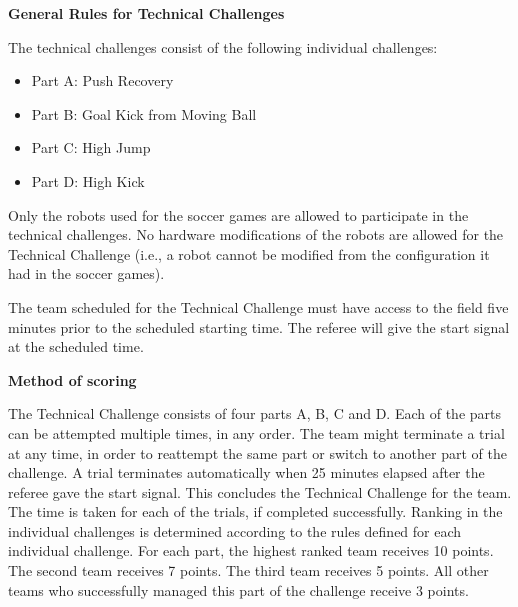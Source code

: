 \clearpage
\sffamily
{\bfseries\color[rgb]{0.4,0.4,0.4}
General Rules for Technical Challenges}
{}

\bigskip

The technical challenges consist of the following individual challenges:

\begin{itemize}
\item Part A: Push Recovery
\item Part B: Goal Kick from Moving Ball
\item Part C: High Jump 
\item Part D: High Kick
\end{itemize}

\bigskip

Only the robots used for the soccer games are allowed to participate in the technical challenges.  No hardware modifications of the robots are allowed for the Technical Challenge (i.e., a robot cannot be modified from the configuration it had in the soccer games). 

\bigskip

The team scheduled for the Technical Challenge must have access to the field five minutes prior to the scheduled starting time. The referee will give the start signal at the scheduled time.

\bigskip

{\bfseries Method of scoring}

\headlinebox
 
The Technical Challenge consists of four parts A, B, C and D. Each of the parts can be attempted multiple times, in any order. The team might terminate a trial at any time, in order to reattempt the same part or switch to another part of the challenge. A trial terminates automatically when 25 minutes elapsed after the referee gave the start
signal. This concludes the Technical Challenge for the team. The time is taken for each of the trials, if completed successfully. Ranking in the individual challenges is determined according to the rules defined
for each individual challenge. For each part, the highest ranked team receives 10 points. The second team receives 7 points. The third team receives 5 points. All other teams who successfully managed this part of the challenge receive 3 points.

